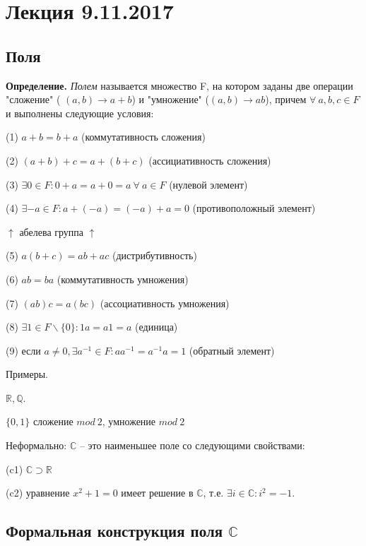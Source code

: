 \section{Лекция 9.11.2017}

\subsection{Поля}

\textbf{Определение.} \textit{Полем} называется множество F, на котором заданы две операции "сложение" ( $(a,b) \rightarrow a+b$) и "умножение" ($(a,b) \rightarrow ab$), причем $\forall \ a, b, c \in F$ и выполнены следующие условия:

(1) $a+b = b+a$ (коммутативность сложения)

(2) $(a+b)+c = a+(b+c)$ (ассициативность сложения)

(3) $\exists 0 \in F: 0 + a = a+ 0 = a \ \forall \ a \in F$ (нулевой элемент)

(4) $\exists -a \in F: a+(-a)=(-a)+a=0$ (противоположный элемент)

$\uparrow$ абелева группа $\uparrow$

(5) $a(b+c) = ab + ac$ (дистрибутивность)

(6) $ab=ba$ (коммутативность умножения)

(7) $(ab)c=a(bc)$ (ассоциативность умножения)

(8) $ \exists 1 \in F \backslash \{0\} : 1a=a1=a$ (единица)

(9) если $a \neq 0, \exists a^{-1} \in F: aa^{-1} = a^{-1} a = 1$ (обратный элемент)

\vspace{\baselineskip}
Примеры. 

$\mathbb{R}, \mathbb{Q}$.

$\{0, 1\}$ сложение $mod \ 2$, умножение $mod \ 2$

\vspace{\baselineskip}
Неформально: $\mathbb{C}$ -- это наименьшее поле со следующими свойствами:

(c1) $\mathbb{C} \supset \mathbb{R}$

(c2) уравнение $x^2 + 1 = 0$ имеет решение в $\mathbb{C}$, т.е. $\exists i \in \mathbb{C}: i^2 = -1$.

\vspace{\baselineskip}
\subsection{Формальная конструкция поля $\mathbb{C}$}

